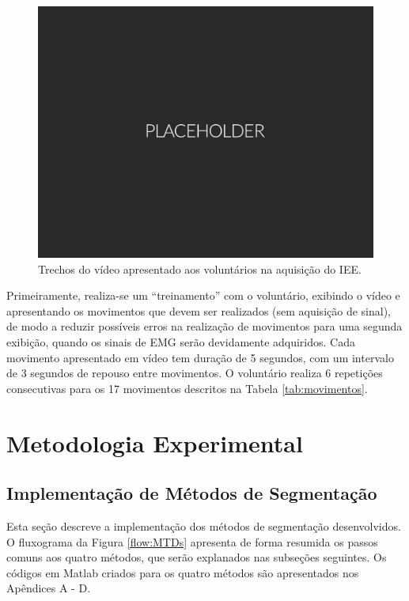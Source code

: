 \begin{figure}[htb]
	\caption{\label{fig:video}Trechos do vídeo apresentado aos voluntários na aquisição do IEE.}
	\begin{center}
	    \includegraphics[width=0.75\linewidth]{./img/placeholder.png}
	\end{center}
\end{figure}

Primeiramente, realiza-se um ``treinamento'' com o voluntário, exibindo o vídeo e apresentando os movimentos que devem ser realizados (sem aquisição de sinal), de modo a reduzir possíveis erros na realização de movimentos para uma segunda exibição, quando os sinais de EMG serão devidamente adquiridos. Cada movimento apresentado em vídeo tem duração de 5 segundos, com um intervalo de 3 segundos de repouso entre movimentos. O voluntário realiza 6 repetições consecutivas para os 17 movimentos descritos na Tabela \ref{tab:movimentos}.



	\chapter{Metodologia Experimental}
		\section{Implementação de Métodos de Segmentação}
Esta seção descreve a implementação dos métodos de segmentação desenvolvidos. O fluxograma da Figura \ref{flow:MTDs} apresenta de forma resumida os passos comuns aos quatro métodos, que serão explanados nas subseções seguintes. Os códigos em Matlab criados para os quatro métodos são apresentados nos Apêndices A - D.

